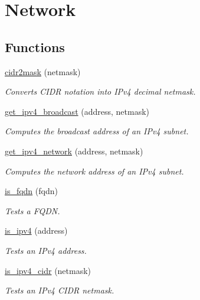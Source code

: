 \hypertarget{group__network}{}\section{Network}
\label{group__network}
\subsection*{Functions}
\begin{DoxyCompactItemize}
\item 
\hyperlink{group__network_ga29eb87466a05fafa3923b9eebd5448fe}{cidr2mask} (netmask)
\begin{DoxyCompactList}\small\item\em Converts C\+I\+DR notation into I\+Pv4 decimal netmask. \end{DoxyCompactList}\item 
\hyperlink{group__network_gaa7e1a6c8a8ae517d7ae3b649dbc975c3}{get\+\_\+ipv4\+\_\+broadcast} (address, netmask)
\begin{DoxyCompactList}\small\item\em Computes the broadcast address of an I\+Pv4 subnet. \end{DoxyCompactList}\item 
\hyperlink{group__network_ga245d578ab59cdd517ba14695a186aeb9}{get\+\_\+ipv4\+\_\+network} (address, netmask)
\begin{DoxyCompactList}\small\item\em Computes the network address of an I\+Pv4 subnet. \end{DoxyCompactList}\item 
\hyperlink{group__network_ga6e20cc89dd0c8bbc15076e5e5bd694d6}{is\+\_\+fqdn} (fqdn)
\begin{DoxyCompactList}\small\item\em Tests a F\+Q\+DN. \end{DoxyCompactList}\item 
\hyperlink{group__network_ga807cd53aced8db0cdab6c03b1d80efef}{is\+\_\+ipv4} (address)
\begin{DoxyCompactList}\small\item\em Tests an I\+Pv4 address. \end{DoxyCompactList}\item 
\hyperlink{group__network_ga797eb7c1580e19ec5b08ceb5ef7a4ff3}{is\+\_\+ipv4\+\_\+cidr} (netmask)
\begin{DoxyCompactList}\small\item\em Tests an I\+Pv4 C\+I\+DR netmask. \end{DoxyCompactList}\item 

\end{DoxyCompactItemize}
